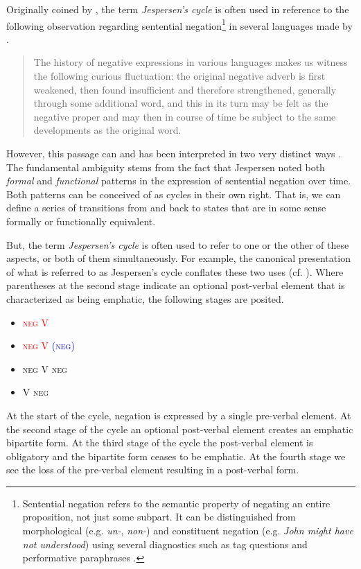 \documentclass[linguex]{sp}
\theoremstyle{definition} \newtheorem{definition}{Definition}
\begin{document}
Originally coined by \citet[88]{dahl:1979}, the term \emph{Jespersen's cycle} is often used in reference to the following observation regarding sentential negation\footnote{Sentential negation refers to the semantic property of negating an entire proposition, not just some subpart. It can be distinguished from morphological (e.g. \emph{un-}, \emph{non-}) and constituent negation (e.g. \emph{John might have not understood}) using several diagnostics such as tag questions \citep{klima1964}  and performative paraphrases \citep{payne1985}.} in several languages made by \citet[4]{jespersen:1917}.

\begin{quote}
The history of negative expressions in various languages makes us witness the following curious fluctuation: the original negative adverb is first weakened, then found insufficient and therefore strengthened, generally through some additional word, and this in its turn may be felt as the negative proper and may then in course of time be subject to the same developments as the original word.
\end{quote}
However, this passage can and has been interpreted in two very distinct ways \citep{vanderAuwera2009}. The fundamental ambiguity stems from the fact that Jespersen noted both \emph{formal} and \emph{functional} patterns in the expression of sentential negation over time. Both patterns can be conceived of as cycles in their own right. That is, we can define a series of transitions from and back to states that are in some sense formally or functionally equivalent. 

But, the term \emph{Jespersen's cycle} is often used to refer to one or the other of these aspects, or both of them simultaneously. For example, the canonical presentation of what is referred to as Jespersen's cycle conflates these two uses (cf. \citealt{posner1985,schwegler1988,ladusaw1993}). Where parentheses at the second stage indicate an optional post-verbal element that is characterized as being emphatic, the following stages are posited.

\begin{itemize}
    \item [1.] \textsc{\textcolor{red}{neg V}}
    \item [2.]  \textsc{\textcolor{red}{neg V} \textcolor{blue}{(neg)}}
    \item [3.] \textsc{\color{blue} neg V neg}
    \item [4.] \textsc{\color{green} V neg}
\end{itemize}
At the start of the cycle, negation is expressed by a single pre-verbal element. At the second stage of the cycle an optional post-verbal element creates an emphatic bipartite form. At the third stage of the cycle the post-verbal element is obligatory and the bipartite form ceases to be emphatic. At the fourth stage we see the loss of the pre-verbal element resulting in a post-verbal form.
\end{document}
